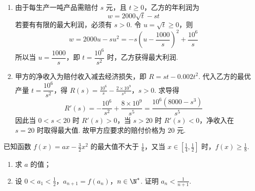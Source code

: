 \begin{solution}
\begin{enumerate}
\item 由于每生产一吨产品需赔付 \(s\) 元，且 \(t\geq0\)，乙方的年利润为
\[
w=2000\sqrt t-st
\]
若要有有限的最大利润，必须有 \(s>0\). 令 \(u=\sqrt t\geq0\)，则
\[
w=2000u-su^2=-s\left(u-\frac{1000}{s}\right)^2+\frac{10^6}{s}
\]
所以当 \(u=\dfrac{1000}{s}\)，即 \(t=\dfrac{10^6}{s^2}\) 时，乙方获得最大利润.

\item 甲方的净收入为赔付收入减去经济损失，即
\(R=st-0.002t^2\). 代入乙方的最优产量 \(t=\dfrac{10^6}{s^2}\)，得
\(R(s)=\frac{10^6}{s}-\frac{2\times10^9}{s^4}\)，\(s>0\).
求导得
\[
R'(s)=-\frac{10^6}{s^2}+\frac{8\times10^9}{s^5}=\frac{10^6(8000-s^3)}{s^5}
\]
因此当 \(0<s<20\) 时 \(R'(s)>0\)，当 \(s>20\) 时 \(R'(s)<0\)，净收入在 \(s=20\) 时取得最大值. 故甲方应要求的赔付价格为 \(20\) 元.
\end{enumerate}
\end{solution}

\begin{problem}
已知函数 \(f(x)=ax-\frac{3}{2}x^{2}\) 的最大值不大于 \(\frac{1}{6}\)，又当 \(x \in \left[\frac{1}{4}, \frac{1}{2}\right]\) 时，\(f(x) \ge \frac{1}{8}\).

\begin{enumerate}
\item 求 \(a\) 的值；
\item 设 \(0 < a_1 < \frac{1}{2}\)，\(a_{n+1} = f(a_n)\)，\(n \in \N^*\). 证明 \(a_n < \frac{1}{n+1}\).
\end{enumerate}
\end{problem}

